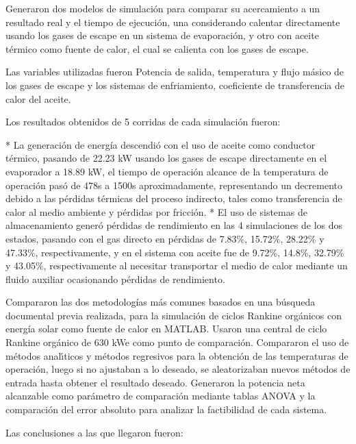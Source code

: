 Generaron dos modelos de simulación para comparar su acercamiento a un resultado real y el tiempo de ejecución, una considerando calentar directamente usando los gases de escape en un sistema de evaporación, y otro con aceite térmico como fuente de calor, el cual se calienta con los gases de escape.

Las variables utilizadas fueron Potencia de salida, temperatura y flujo másico de los gases de escape y los sistemas de enfriamiento, coeficiente de transferencia de calor del aceite.

Los resultados obtenidos de 5 corridas de cada simulación fueron:

\begin{markdown}
* La generación de energía descendió con el uso de aceite como conductor térmico, pasando de 22.23 kW usando los gases de escape directamente en el evaporador a 18.89 kW, el tiempo de operación alcance de la temperatura de operación pasó de 478s a 1500s aproximadamente, representando un decremento debido a las pérdidas térmicas del proceso indirecto, tales como transferencia de calor al medio ambiente y pérdidas por fricción.
* El uso de sistemas de almacenamiento generó pérdidas de rendimiento en las 4 simulaciones de los dos estados, pasando con el gas directo en pérdidas de 7.83\%, 15.72\%, 28.22\% y 47.33\%, respectivamente, y en el sistema con aceite fue de 9.72\%, 14.8\%, 32.79\% y 43.05\%, respectivamente al necesitar transportar el medio de calor mediante un fluido auxiliar ocasionando pérdidas de rendimiento.
\end{markdown}


\textcite{PETROLLESE2020113307} Compararon las dos metodologías más comunes basados en una búsqueda documental previa realizada, para la simulación de ciclos Rankine orgánicos con energía solar como fuente de calor en MATLAB. Usaron una central de ciclo Rankine orgánico de 630 kWe como punto de comparación. Compararon el uso de métodos analı́ticos y métodos regresivos para la obtención de las temperaturas de operación, luego si no ajustaban a lo deseado, se aleatorizaban nuevos métodos de entrada hasta obtener el resultado deseado. Generaron la potencia neta alcanzable como parámetro de comparación mediante tablas ANOVA y la comparación del error absoluto para analizar la factibilidad de cada sistema.

Las conclusiones a las que llegaron fueron:

